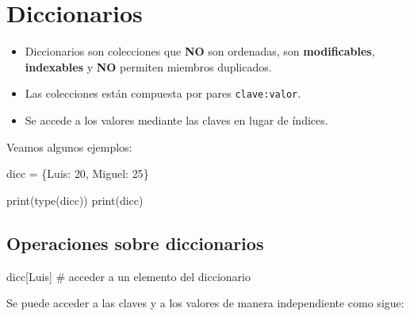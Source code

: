 \documentclass[
  letterpaper,
  DIV=11,
  numbers=noendperiod]{scrreprt}
\newenvironment{Shaded}{\begin{snugshade}}{\end{snugshade}}
\newcommand{\BuiltInTok}[1]{\textcolor[rgb]{0.00,0.23,0.31}{#1}}
\newcommand{\CommentTok}[1]{\textcolor[rgb]{0.37,0.37,0.37}{#1}}
\newcommand{\DecValTok}[1]{\textcolor[rgb]{0.68,0.00,0.00}{#1}}
\newcommand{\NormalTok}[1]{\textcolor[rgb]{0.00,0.23,0.31}{#1}}
\newcommand{\OperatorTok}[1]{\textcolor[rgb]{0.37,0.37,0.37}{#1}}
\newcommand{\StringTok}[1]{\textcolor[rgb]{0.13,0.47,0.30}{#1}}
\providecommand{\tightlist}{%
  \setlength{\itemsep}{0pt}\setlength{\parskip}{0pt}}\usepackage{longtable,booktabs,array}
\begin{document}

\chapter{Diccionarios}\label{diccionarios}

\begin{itemize}
\tightlist
\item
  Diccionarios son colecciones que \textbf{NO} son ordenadas, son
  \textbf{modificables}, \textbf{indexables} y \textbf{NO} permiten
  miembros duplicados.
\item
  Las colecciones están compuesta por pares \texttt{clave:valor}.
\item
  Se accede a los valores mediante las claves en lugar de índices.
\end{itemize}

Veamos algunos ejemplos:

\begin{Shaded}
\begin{Highlighting}[]
\NormalTok{dicc }\OperatorTok{=}\NormalTok{ \{}\StringTok{\textquotesingle{}Luis\textquotesingle{}}\NormalTok{: }\DecValTok{20}\NormalTok{, }\StringTok{\textquotesingle{}Miguel\textquotesingle{}}\NormalTok{: }\DecValTok{25}\NormalTok{\}}
\end{Highlighting}
\end{Shaded}

\begin{Shaded}
\begin{Highlighting}[]
\BuiltInTok{print}\NormalTok{(}\BuiltInTok{type}\NormalTok{(dicc))}
\BuiltInTok{print}\NormalTok{(dicc)}
\end{Highlighting}
\end{Shaded}

\section{Operaciones sobre
diccionarios}\label{operaciones-sobre-diccionarios}

\begin{Shaded}
\begin{Highlighting}[]
\NormalTok{dicc[}\StringTok{\textquotesingle{}Luis\textquotesingle{}}\NormalTok{] }\CommentTok{\# acceder a un elemento del diccionario}
\end{Highlighting}
\end{Shaded}

Se puede acceder a las claves y a los valores de manera independiente
como sigue:
\end{document}
